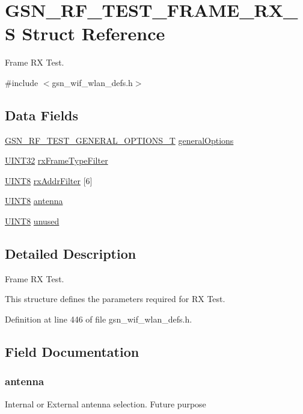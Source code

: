 \hypertarget{a00186}{
\section{GSN\_\-RF\_\-TEST\_\-FRAME\_\-RX\_\-S Struct Reference}
\label{a00186}
}


Frame RX Test.  




{\ttfamily \#include $<$gsn\_\-wif\_\-wlan\_\-defs.h$>$}

\subsection*{Data Fields}
\begin{DoxyCompactItemize}
\item 
\hyperlink{a00188}{GSN\_\-RF\_\-TEST\_\-GENERAL\_\-OPTIONS\_\-T} \hyperlink{a00186_a5e4e9e8d2b76fbb6bdf201c4aeddd60d}{generalOptions}
\item 
\hyperlink{a00660_gae1e6edbbc26d6fbc71a90190d0266018}{UINT32} \hyperlink{a00186_a59ce6e4a0332eaaa2fdf5fb0fe867452}{rxFrameTypeFilter}
\item 
\hyperlink{a00660_gab27e9918b538ce9d8ca692479b375b6a}{UINT8} \hyperlink{a00186_ab846177adabc3dd3f04e9f9e7fcc469d}{rxAddrFilter} \mbox{[}6\mbox{]}
\item 
\hyperlink{a00660_gab27e9918b538ce9d8ca692479b375b6a}{UINT8} \hyperlink{a00186_ad84150bc4d20a5e841d834b269db9901}{antenna}
\item 
\hyperlink{a00660_gab27e9918b538ce9d8ca692479b375b6a}{UINT8} \hyperlink{a00186_a04efd61f68d1dcc6739211e703576ea7}{unused}
\end{DoxyCompactItemize}


\subsection{Detailed Description}
Frame RX Test. 

This structure defines the parameters required for RX Test. 

Definition at line 446 of file gsn\_\-wif\_\-wlan\_\-defs.h.



\subsection{Field Documentation}
\hypertarget{a00186_ad84150bc4d20a5e841d834b269db9901}{
\subsubsection[{antenna}]{ {\bf antenna}}}
\label{a00186_ad84150bc4d20a5e841d834b269db9901}
Internal or External antenna selection. Future purpose 

